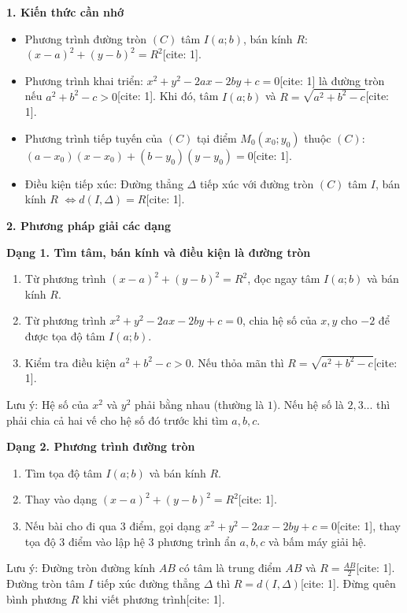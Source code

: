\textbf{1. Kiến thức cần nhớ}
\begin{itemize}
\item Phương trình đường tròn $(C)$ tâm $I(a; b)$, bán kính $R$: $\boxed{(x-a)^2 + (y-b)^2 = R^2}$[cite: 1].
\item Phương trình khai triển: $x^2 + y^2 - 2ax - 2by + c = 0$[cite: 1] là đường tròn nếu $a^2 + b^2 - c > 0$[cite: 1]. Khi đó, tâm $I(a; b)$ và $R = \sqrt{a^2 + b^2 - c}$[cite: 1].
\item Phương trình tiếp tuyến của $(C)$ tại điểm $M_0(x_0; y_0)$ thuộc $(C)$: $(a - x_0)(x - x_0) + (b - y_0)(y - y_0) = 0$[cite: 1].
\item Điều kiện tiếp xúc: Đường thẳng $\Delta$ tiếp xúc với đường tròn $(C)$ tâm $I$, bán kính $R$ $\Leftrightarrow d(I, \Delta) = R$[cite: 1].
\end{itemize}

\textbf{2. Phương pháp giải các dạng}

\textbf{Dạng 1. Tìm tâm, bán kính và điều kiện là đường tròn}
\begin{enumerate}
\item Từ phương trình $(x-a)^2 + (y-b)^2 = R^2$, đọc ngay tâm $I(a; b)$ và bán kính $R$.
\item Từ phương trình $x^2 + y^2 - 2ax - 2by + c = 0$, chia hệ số của $x, y$ cho $-2$ để được tọa độ tâm $I(a; b)$.
\item Kiểm tra điều kiện $a^2 + b^2 - c > 0$. Nếu thỏa mãn thì $R = \sqrt{a^2 + b^2 - c}$[cite: 1].
\end{enumerate}
Lưu ý: Hệ số của $x^2$ và $y^2$ phải bằng nhau (thường là $1$). Nếu hệ số là $2, 3...$ thì phải chia cả hai vế cho hệ số đó trước khi tìm $a, b, c$.

\textbf{Dạng 2. Phương trình đường tròn}
\begin{enumerate}
\item Tìm tọa độ tâm $I(a; b)$ và bán kính $R$.
\item Thay vào dạng $(x-a)^2 + (y-b)^2 = R^2$[cite: 1].
\item Nếu bài cho đi qua $3$ điểm, gọi dạng $x^2 + y^2 - 2ax - 2by + c = 0$[cite: 1], thay tọa độ $3$ điểm vào lập hệ $3$ phương trình ẩn $a, b, c$ và bấm máy giải hệ.
\end{enumerate}
Lưu ý: Đường tròn đường kính $AB$ có tâm là trung điểm $AB$ và $R = \frac{AB}{2}$[cite: 1]. Đường tròn tâm $I$ tiếp xúc đường thẳng $\Delta$ thì $R = d(I, \Delta)$[cite: 1]. Đừng quên bình phương $R$ khi viết phương trình[cite: 1].

